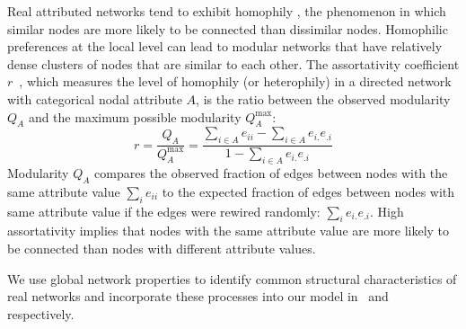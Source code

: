 
Real attributed networks tend to exhibit homophily
\cite{mcpherson2001birds}, the phenomenon in which similar nodes are more likely
to be connected than dissimilar nodes. Homophilic preferences at the local level
can lead to modular networks that have relatively dense clusters of nodes that are similar
to each other. The assortativity coefficient $r$~\cite{newman2002assortative},
which measures the level of homophily (or heterophily) in a directed network with
categorical nodal attribute $A$, is the ratio between the
observed modularity $Q_A$ and the maximum possible modularity $Q^{\max}_A$:
$$ r = \frac{Q_A}{Q^{\max}_A} = \frac{\sum\limits_{i \in A} e_{ii} - \sum\limits_{i \in A} e_{i.}e_{.i}}{1 - \sum\limits_{i \in A} e_{i.}e_{.i}} $$
Modularity $Q_A$ compares the observed fraction of edges between nodes with the same attribute
value $\sum_i e_{ii}$ to the expected fraction of edges between nodes with same
attribute value if the edges were rewired randomly:  $\sum_i e_{i.}e_{.i}$.
High assortativity implies that nodes with the same
attribute value are more likely to be connected than nodes with different attribute values.

We use global network properties to identify common structural
characteristics of real networks and incorporate these processes into our model
in~ and~ respectively.


